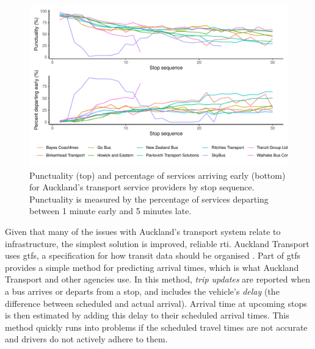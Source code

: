 \begin{knitrout}\small
{}\color{fgcolor}\begin{figure}
\includegraphics[width=\linewidth]{figure/schedule_adhere-1} \caption[Punctuality of Auckland's transport service providers]{Punctuality (top) and percentage of services arriving early (bottom) for Auckland's transport service providers by stop sequence. Punctuality is measured by the percentage of services departing between 1 minute early and 5 minutes late.}\label{fig:schedule_adhere}
\end{figure}


\end{knitrout}



Given that many of the issues with Auckland's transport system relate to infrastructure, the simplest solution is improved, reliable \gls{rti}. Auckland Transport uses \gls{gtfs}, a specification for how transit data should be organised \citep{GoogleDevelopers_2006}. Part of \gls{gtfs} provides a simple method for predicting arrival times, which is what Auckland Transport and other agencies use. In this method, \emph{trip updates} are reported when a bus arrives or departs from a stop, and includes the vehicle's \emph{delay} (the difference between scheduled and actual arrival). Arrival time at upcoming stops is then estimated by adding this delay to their scheduled arrival times. This method quickly runs into problems if the scheduled travel times are not accurate and drivers do not actively adhere to them.


